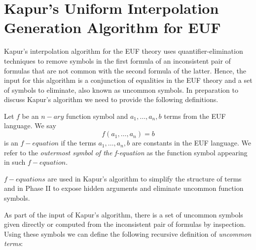 \section{Kapur's Uniform Interpolation Generation Algorithm for EUF}

Kapur's interpolation algorithm for the EUF theory uses quantifier-elimination
techniques to remove symbols in the first formula of an inconsistent pair of formulas
that are not common with the second formula of the latter. 
Hence, the input for this algorithm is a conjunction of equalities in the
EUF theory and a set of symbols to eliminate, also known as uncommon symbols.
In preparation to discuss Kapur's algorithm we need to provide the 
following definitions.

\begin{definition} 
  Let $f$ be an $n-ary$ function symbol and $a_1, \dots, a_n,
  b$ terms from the EUF language. We say 
  \begin{equation*}
    f(a_1, \dots, a_n) = b
  \end{equation*}
  is an $f-equation$ if the terms $a_1, \dots, a_n, b$ are constants in
  the EUF language. We refer to the \emph{outermost symbol of the f-equation}
  as the function symbol appearing in such $f-equation$.
\end{definition}

$f-equations$ are used in Kapur's algorithm to simplify the structure of terms 
and in Phase II to expose hidden arguments and eliminate uncommon function symbols.

As part of the input of Kapur's algorithm, there is a set of uncommon symbols given 
directly or computed from the inconsistent pair of formulas by inspection. Using
these symbols we can define the following recursive definition of \emph{uncommon terms}:

